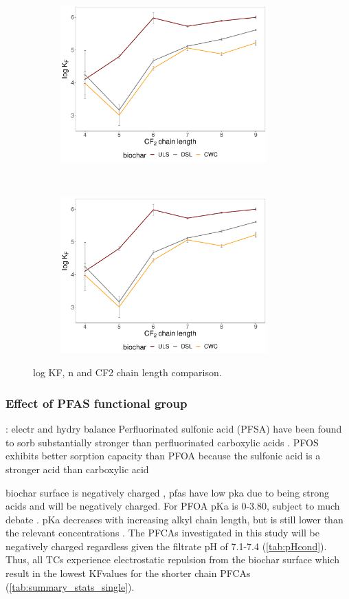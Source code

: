 \begin{figure}[t!]
    \centering
    \begin{subfigure}[t]{0.5\textwidth}
        \centering
        \includegraphics[height=6cm]{R/figs/n_KF.pdf}
        \caption{}
    \end{subfigure}%
    ~ 
    \begin{subfigure}[t]{0.5\textwidth}
        \centering
        \includegraphics[height=6cm]{R/figs/chainlength_KF_line.pdf}
        \caption{}
    \end{subfigure}
    \caption{log KF, n and CF2 chain length comparison.}
\end{figure}

\subsubsection{Effect of PFAS functional group}
\cite{du2014adsorption}: electr and hydry balance 
Perfluorinated sulfonic acid (PFSA) have been found to sorb substantially stronger than perfluorinated carboxylic acids \citep{zhang2013sorption,zhang2021sorption}. PFOS exhibits better sorption capacity than PFOA because the sulfonic acid is a stronger acid than carboxylic acid \citep{arvaniti2015review}

biochar surface is negatively charged \citep{Ahmad2014}, pfas have low pka due to being strong acids and will be negatively charged. For PFOA pKa is 0-3.80, subject to much debate \citep{Goss2009comment,ding2013physicochemical}. pKa decreases with increasing alkyl chain length, but is still lower than the relevant concentrations \citep{ding2013physicochemical}. The PFCAs investigated in this study will be negatively charged regardless given the filtrate pH of 7.1-7.4 (\cref{tab:pHcond}). Thus, all TCs experience electrostatic repulsion from the biochar surface which result in the lowest KFvalues for the shorter chain PFCAs (\cref{tab:summary_stats_single}). 

